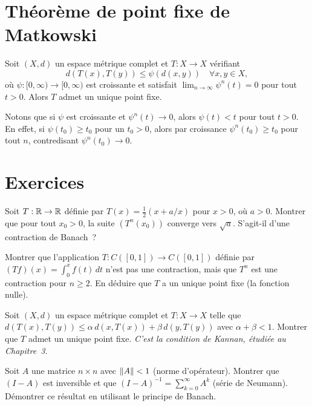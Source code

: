 \section{Th\'eor\`eme de point fixe de Matkowski}

\begin{theoreme}[Matkowski, 1975]
Soit $(X, d)$ un espace m\'etrique complet et $T : X \to X$ v\'erifiant
\[
    d(T(x), T(y)) \leq \psi(d(x, y)) \quad \forall x, y \in X,
\]
o\`u $\psi : [0, \infty) \to [0, \infty)$ est croissante et satisfait
$\lim_{n \to \infty} \psi^n(t) = 0$ pour tout $t > 0$.
Alors $T$ admet un unique point fixe.
\end{theoreme}

\begin{remarque}
Notons que si $\psi$ est croissante et $\psi^n(t) \to 0$, alors $\psi(t) < t$
pour tout $t > 0$. En effet, si $\psi(t_0) \geq t_0$ pour un $t_0 > 0$,
alors par croissance $\psi^n(t_0) \geq t_0$ pour tout $n$, contredisant
$\psi^n(t_0) \to 0$.
\end{remarque}

\section{Exercices}

\begin{exercice}
Soit $T : \mathbb{R} \to \mathbb{R}$ d\'efinie par $T(x) = \frac{1}{2}(x + a/x)$ pour $x > 0$,
o\`u $a > 0$. Montrer que pour tout $x_0 > 0$, la suite $(T^n(x_0))$ converge
vers $\sqrt{a}$. S'agit-il d'une contraction de Banach~?
\end{exercice}

\begin{exercice}
Montrer que l'application $T : C([0,1]) \to C([0,1])$ d\'efinie par
$(Tf)(x) = \int_0^x f(t) \, dt$ n'est pas une contraction, mais que $T^n$ est
une contraction pour $n \geq 2$. En d\'eduire que $T$ a un unique point fixe
(la fonction nulle).
\end{exercice}

\begin{exercice}
Soit $(X, d)$ un espace m\'etrique complet et $T : X \to X$ telle que
$d(T(x), T(y)) \leq \alpha \, d(x, T(x)) + \beta \, d(y, T(y))$ avec
$\alpha + \beta < 1$. Montrer que $T$ admet un unique point fixe.
\textit{C'est la condition de Kannan, \'etudi\'ee au Chapitre~3.}
\end{exercice}

\begin{exercice}
Soit $A$ une matrice $n \times n$ avec $\left\| A \right\| < 1$ (norme d'op\'erateur).
Montrer que $(I - A)$ est inversible et que $(I - A)^{-1} = \sum_{k=0}^\infty A^k$
(s\'erie de Neumann). D\'emontrer ce r\'esultat en utilisant le principe de Banach.
\end{exercice}

